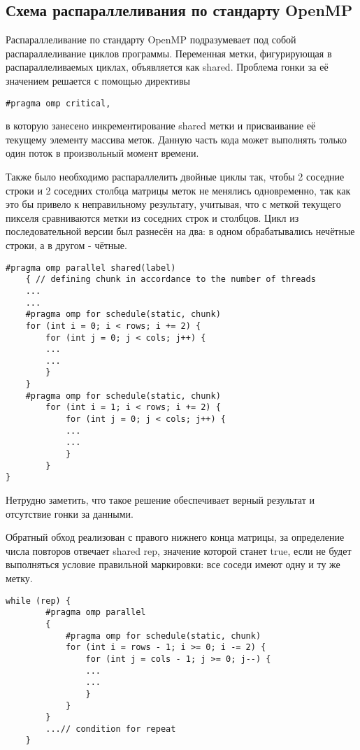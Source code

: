 \documentclass{report}
\begin{document}
\subsection{Схема распараллеливания по стандарту OpenMP}
Распараллеливание по стандарту OpenMP подразумевает под собой распараллеливание циклов программы. Переменная метки, фигурирующая в распараллеливаемых циклах, объявляется как shared. Проблема гонки за её значением решается с помощью директивы 
\begin{lstlisting}
#pragma omp critical,
\end{lstlisting}
в которую занесено инкрементирование shared метки и присваивание её текущему элементу массива меток. Данную часть кода может выполнять только один поток в произвольный момент времени.
\par Также было необходимо распараллелить двойные циклы так, чтобы 2 соседние строки и 2 соседних столбца матрицы меток не менялись одновременно, так как это бы привело к неправильному результату, учитывая, что с меткой текущего пикселя сравниваются метки из соседних строк и столбцов. Цикл из последовательной версии был разнесён на два: в одном обрабатывались нечётные строки, а в другом - чётные. 
\begin{lstlisting}
#pragma omp parallel shared(label)
    { // defining chunk in accordance to the number of threads
    ...
    ...
    #pragma omp for schedule(static, chunk)
    for (int i = 0; i < rows; i += 2) {
        for (int j = 0; j < cols; j++) {
        ...
        ...
        }
    }
    #pragma omp for schedule(static, chunk)
        for (int i = 1; i < rows; i += 2) {
            for (int j = 0; j < cols; j++) { 
            ...
            ...
            }
        }
}
\end{lstlisting}
Нетрудно заметить, что такое решение обеспечивает верный результат и отсутствие гонки за данными.
\par Обратный обход реализован с правого нижнего конца матрицы, за определение числа повторов отвечает shared rep, значение которой станет true, если не будет выполняться условие правильной маркировки: все соседи имеют одну и ту же метку.
\begin{lstlisting}
while (rep) {
        #pragma omp parallel
        {
            #pragma omp for schedule(static, chunk)
            for (int i = rows - 1; i >= 0; i -= 2) {
                for (int j = cols - 1; j >= 0; j--) {
                ...
                ...
                }
            }
        }
        ...// condition for repeat
    }
\end{lstlisting}
\end{document}
